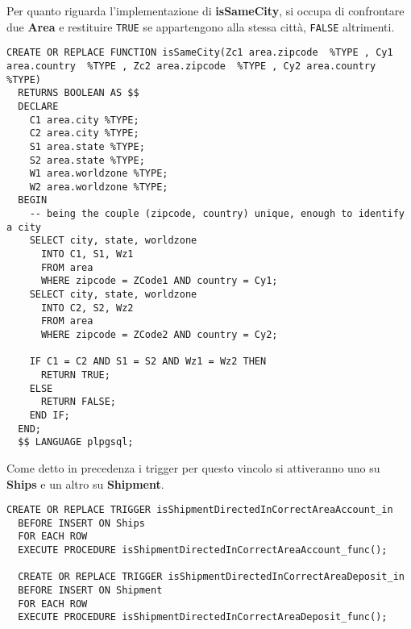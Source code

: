 Per quanto riguarda l'implementazione di \textbf{isSameCity}, si occupa di confrontare due \textbf{Area} e restituire \lstinline{TRUE} se appartengono alla stessa città, \lstinline{FALSE} altrimenti.

\begin{lstlisting}[caption={Funzione \textbf{isSameCity}}, label={isSameCity}]
  CREATE OR REPLACE FUNCTION isSameCity(Zc1 area.zipcode  %TYPE , Cy1 area.country  %TYPE , Zc2 area.zipcode  %TYPE , Cy2 area.country %TYPE)
  RETURNS BOOLEAN AS $$
  DECLARE
    C1 area.city %TYPE;
    C2 area.city %TYPE;
    S1 area.state %TYPE;
    S2 area.state %TYPE;
    W1 area.worldzone %TYPE;
    W2 area.worldzone %TYPE;
  BEGIN
    -- being the couple (zipcode, country) unique, enough to identify a city
    SELECT city, state, worldzone
      INTO C1, S1, Wz1
      FROM area
      WHERE zipcode = ZCode1 AND country = Cy1;
    SELECT city, state, worldzone
      INTO C2, S2, Wz2
      FROM area
      WHERE zipcode = ZCode2 AND country = Cy2;

    IF C1 = C2 AND S1 = S2 AND Wz1 = Wz2 THEN
      RETURN TRUE;
    ELSE
      RETURN FALSE;
    END IF;
  END;
  $$ LANGUAGE plpgsql;
\end{lstlisting}

Come detto in precedenza i trigger per questo vincolo si attiveranno uno su \textbf{Ships} e un altro su \textbf{Shipment}.

\begin{lstlisting}[caption={Trigger per il vincolo \textbf{isShipmentDirectedInCorrectArea}}]
  CREATE OR REPLACE TRIGGER isShipmentDirectedInCorrectAreaAccount_in
  BEFORE INSERT ON Ships
  FOR EACH ROW 
  EXECUTE PROCEDURE isShipmentDirectedInCorrectAreaAccount_func();
  
  CREATE OR REPLACE TRIGGER isShipmentDirectedInCorrectAreaDeposit_in
  BEFORE INSERT ON Shipment 
  FOR EACH ROW 
  EXECUTE PROCEDURE isShipmentDirectedInCorrectAreaDeposit_func();
\end{lstlisting}


